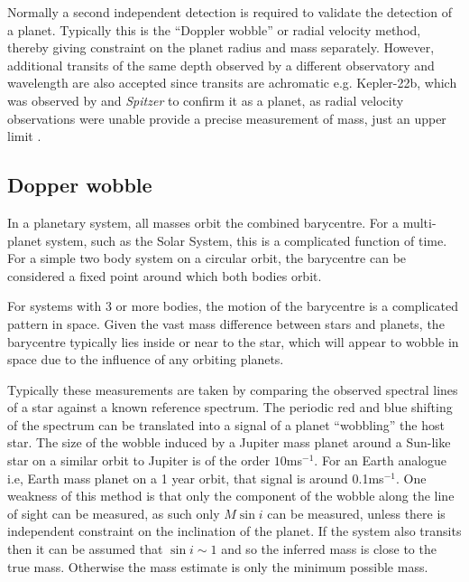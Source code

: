 Normally a second independent detection is required to validate the detection of a planet. Typically this is the ``Doppler wobble'' or radial velocity method, thereby giving constraint on the planet radius and mass separately. However, additional transits of the same depth observed by a different observatory and wavelength are also accepted since transits are achromatic \citep{2015Desert} e.g. Kepler-22b, which was observed by \Kepler and \emph{Spitzer} to confirm it as a planet, as radial velocity observations were unable provide a precise measurement of mass, just an upper limit \citep{2012Borucki}.

\subsection{Dopper wobble}\label{sec:doppler}
In a planetary system, all masses orbit the combined barycentre. For a multi-planet system, such as the Solar System, this is a complicated function of time. For a simple two body system on a circular orbit, the barycentre can be considered a fixed point around which both bodies orbit. 

For systems with 3 or more bodies, the motion of the barycentre is a complicated pattern in space. Given the vast mass difference between stars and planets, the barycentre typically lies inside or near to the star, which will appear to wobble in space due to the influence of any orbiting planets. 

Typically these measurements are taken by comparing the observed spectral lines of a star against a known reference spectrum. The periodic red and blue shifting of the spectrum can be translated into a signal of a planet ``wobbling'' the host star. The size of the wobble induced by a Jupiter mass planet around a Sun-like star on a similar orbit to Jupiter is of the order $10$ms$^{-1}$.  For an Earth analogue i.e, Earth mass planet on a 1 year orbit, that signal is around 0.1ms$^{-1}$. One weakness of this method is that only the component of the wobble along the line of sight can be measured, as such only $M\sin i$ can be measured, unless there is independent constraint on the inclination of the planet. If the system also transits then it can be assumed that $\sin{i}\sim 1$ and so the inferred mass is close to the true mass.
Otherwise the mass estimate is only the minimum possible mass.


